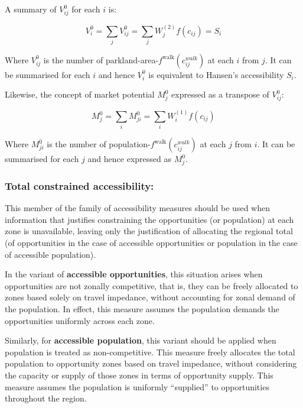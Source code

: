 \documentclass[
11pt, %
oneside, %
english, %
singlespacing, %
]{macthesis} %
\begin{document}
A summary of \(V_{ij}^0\) for each \(i\) is:

\begin{equation}
\label{eq:unconstrained-accessibility-park}
V^0_i = \sum_j V^0_{ij} = \sum_j W^{(2)}_j f(c_{ij}) = S_i
\end{equation} 

Where \(V^0_{ij}\) is the number of parkland-area-\(f^\text{walk}(c^{walk}_{ij})\) at each \(i\) from \(j\). It can be summarised for each \(i\) and hence \(V^0_i\) is equivalent to Hansen's accessibility \(S_i\).

Likewise, the concept of market potential \(M_j^0\) expressed as a transpose of \(V^0_{ij}\):

\begin{equation}
\label{eq:unconstrained-market-park}
M_j^0 = \sum_i M^0_{ji} = \sum_i W_i^{(1)} f(c_{ij})
\end{equation} 

Where \(M^0_{ji}\) is the number of population-\(f^\text{walk}(c^{walk}_{ij})\) at each \(j\) from \(i\). It can be summarised for each \(j\) and hence expressed as \(M^0_j\).

\subsubsection{Total constrained accessibility:}\label{total-constrained-accessibility-1}

This member of the family of accessibility measures should be used when information that justifies constraining the opportunities (or population) at each zone is unavailable, leaving only the justification of allocating the regional total (of opportunities in the case of accessible opportunities or population in the case of accessible population).

In the variant of \textbf{accessible opportunities}, this situation arises when opportunities are not zonally competitive, that is, they can be freely allocated to zones based solely on travel impedance, without accounting for zonal demand of the population. In effect, this measure assumes the population demands the opportunities uniformly across each zone.

Similarly, for \textbf{accessible population}, this variant should be applied when population is treated as non-competitive. This measure freely allocates the total population to opportunity zones based on travel impedance, without considering the capacity or supply of those zones in terms of opportunity supply. This measure assumes the population is uniformly ``supplied'' to opportunities throughout the region.
\end{document}
